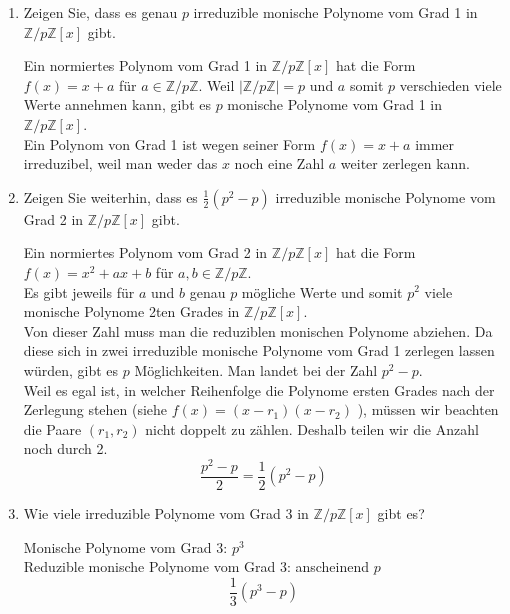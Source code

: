 \documentclass{article} %
\begin{document}
\begin{enumerate}
    \item[(a)] Zeigen Sie, dass es genau \( p \) irreduzible monische Polynome vom Grad 1 in \( \mathbb{Z}/p\mathbb{Z}[x] \) gibt.
    \begin{mybox}
     Ein normiertes Polynom vom Grad 1 in  \( \mathbb{Z}/p\mathbb{Z}[x] \) hat die Form $f(x)=x+a$ für $a \in \mathbb{Z}/p\mathbb{Z}$. Weil $|\mathbb{Z}/p\mathbb{Z}| = p$ und $a$ somit $p$ verschieden viele Werte annehmen kann, gibt es $p$ monische Polynome vom Grad 1 in \( \mathbb{Z}/p\mathbb{Z}[x] \). \\
     Ein Polynom von Grad 1 ist wegen seiner Form $f(x)=x+a$ immer irreduzibel, weil man weder das $x$ noch eine Zahl $a$ weiter zerlegen kann. 
    \end{mybox}
    \item[(b)] Zeigen Sie weiterhin, dass es \( \frac{1}{2}(p^2 - p) \) irreduzible monische Polynome vom Grad 2 in \( \mathbb{Z}/p\mathbb{Z}[x] \) gibt.
    \begin{mybox}
    Ein normiertes Polynom vom Grad 2 in \( \mathbb{Z}/p\mathbb{Z}[x] \) hat die Form $f(x)=x^2+ax+b$ für $a,b \in \mathbb{Z}/p\mathbb{Z}$. \\
    Es gibt jeweils für $a$ und $b$ genau $p$ mögliche Werte und somit $p^2$ viele monische Polynome 2ten Grades in \( \mathbb{Z}/p\mathbb{Z}[x] \). \\
    Von dieser Zahl muss man die reduziblen monischen Polynome abziehen. Da diese sich in zwei irreduzible monische Polynome vom Grad 1 zerlegen lassen würden, gibt es $p$ Möglichkeiten. Man landet bei der Zahl $p^2-p$. \\
    Weil es egal ist, in welcher Reihenfolge die Polynome ersten Grades nach der Zerlegung stehen (siehe $f(x)=(x-r_1)(x-r_2)$ ), müssen wir beachten die Paare $(r_1, r_2)$ nicht doppelt zu zählen. Deshalb teilen wir die Anzahl noch durch 2. 
    \[ \frac{p^2-p}{2} = \frac{1}{2}(p^2 - p)\]
    \end{mybox} 
    \item[(c)] Wie viele irreduzible Polynome vom Grad 3 in \( \mathbb{Z}/p\mathbb{Z}[x] \) gibt es?
    \begin{mybox}
    Monische Polynome vom Grad 3: $p^3$ \\
    Reduzible monische Polynome vom Grad 3: anscheinend $p$
     \[
     \frac{1}{3}(p^3-p)
     \]
    \end{mybox}
\end{enumerate}
\end{document}
